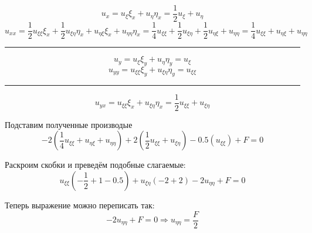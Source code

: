\documentclass[a4paper,12pt]{article}
\begin{document}
		\[
			u_x = u_\xi \xi_x + u_\eta \eta_x =  \frac{1}{2}u_\xi+ u_\eta 
		\]
		\[
			u_{xx} =  \frac{1}{2}u_{\xi\xi} \xi_x+ \frac{1}{2}u_{\xi\eta} \eta_x +  u_{\eta\xi }\xi_x + u_{\eta\eta} \eta_x = 
			 \frac{1}{4}u_{\xi\xi}+ \frac{1}{2}u_{\xi\eta} +  \frac{1}{2}u_{\eta\xi } + u_{\eta\eta}  = 
			 \frac{1}{4}u_{\xi\xi}+u_{\eta\xi } + u_{\eta\eta}
		\]
			\begin{center}
				\rule{0.8\linewidth}{1pt}
			\end{center}
			
		\[
			u_y = u_\xi \xi_y + u_\eta \eta_y = u_\xi 
		\]
		\[
			u_{yy} = u_{\xi\xi} \xi_y + u_{\xi\eta} \eta_y = u_{\xi\xi}
		\]
		\begin{center}
			\rule{0.8\linewidth}{1pt}
		\end{center}
		\[
			u_{yx} = u_{\xi\xi}\xi_x + u_{\xi\eta}\eta_x = \frac{1}{2}u_{\xi\xi} + u_{\xi\eta}
		\]
		
		Подставим полученные производые
		\[
			-2\left(\frac{1}{4}u_{\xi\xi}+u_{\eta\xi } + u_{\eta\eta}\right) + 2 \left(\frac{1}{2}u_{\xi\xi} + u_{\xi\eta}\right) - 0.5 \left(u_{\xi\xi}\right)  + F=0
		\]
		
			Раскроим скобки и преведём подобные слагаемые:
		\[
			u_{\xi\xi} \left( -\frac{1}{2} + 1 - 0.5\right) +u_{\xi\eta}(-2 + 2) -2u_{\eta\eta} + F = 0
		\]
		
		Теперь выражение можно переписать так:
		\[
			-2u_{\eta\eta} + F = 0 \Rightarrow u_{\eta\eta} = \frac{F}{2}
		\]
	
\end{document}
